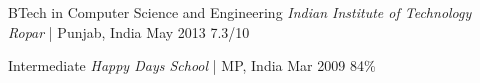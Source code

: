 



\begin{cvhonors}

  \cvhonor
    {\normalsize BTech in Computer Science and Engineering} %
    {\textit{Indian Institute of Technology Ropar} | Punjab, India} %
    {May 2013} %
    {7.3/10} %

  \cvhonor
    {\normalsize Intermediate} %
    {\textit{Happy Days School} | MP, India} %
    {Mar 2009} %
    {84\%} %


\end{cvhonors}







    
